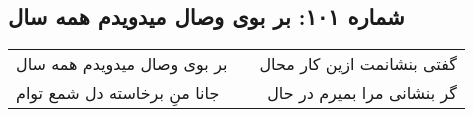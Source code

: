 \begin{center}
\section*{شماره ۱۰۱: بر بوی وصال میدویدم همه سال}
\label{sec:101}
\begin{longtable}{l p{0.5cm} r}
بر بوی وصال میدویدم همه سال
&&
گفتی بنشانمت ازین کار محال
\\
جانا منِ برخاسته دل شمع توام
&&
گر بنشانی مرا بمیرم در حال
\\
\end{longtable}
\end{center}
